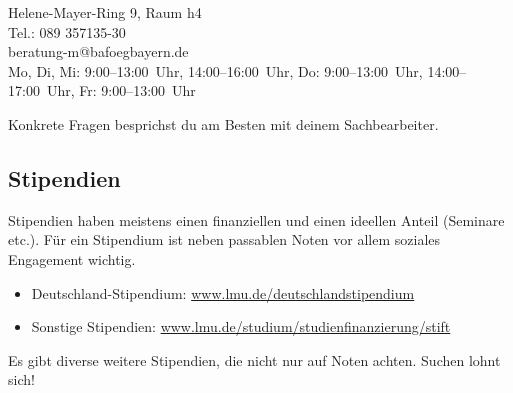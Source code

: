 Helene-Mayer-Ring 9, Raum h4\\
Tel.: 089 357135-30\\
beratung-m@bafoegbayern.de\\
Mo, Di, Mi: 9:00--13:00~Uhr, 14:00--16:00~Uhr, Do: 9:00--13:00~Uhr, 14:00--17:00~Uhr, Fr: 9:00--13:00~Uhr

Konkrete Fragen besprichst du am Besten mit deinem Sachbearbeiter.

\subsection{Stipendien}
Stipendien haben meistens einen finanziellen und einen ideellen Anteil
(Seminare etc.). Für ein Stipendium ist neben passablen Noten vor
allem soziales Engagement wichtig.

\begin{itemize}
	\item Deutschland-Stipendium: \url{www.lmu.de/deutschlandstipendium}
	\item Sonstige Stipendien: \url{www.lmu.de/studium/studienfinanzierung/stift}
\end{itemize}

Es gibt diverse weitere Stipendien, die nicht nur auf Noten achten.
Suchen lohnt sich!
